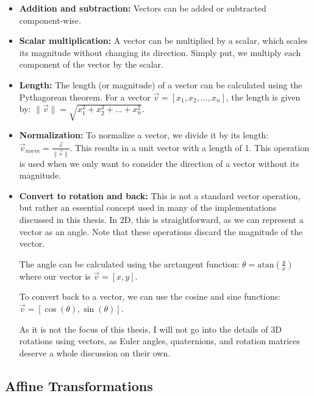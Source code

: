 \begin{itemize}
    \item \textbf{Addition and subtraction:} Vectors can be added or subtracted component-wise.
    
    \item \textbf{Scalar multiplication:} A vector can be multiplied by a scalar, which scales its magnitude without changing its direction. Simply put, we multiply each component of the vector by the scalar.
    
    \item \textbf{Length:} The length (or magnitude) of a vector can be calculated using the Pythagorean theorem. For a vector \(\vec{v} = [x_1, x_2, \ldots, x_n]\), the length is given by: \(\|\vec{v}\| = \sqrt{x_1^2 + x_2^2 + \ldots + x_n^2}\).
    
    \pagebreak

    \item \textbf{Normalization: } To normalize a vector, we divide it by its length: \(\vec{v}_{norm} = \frac{\vec{v}}{\|\vec{v}\|}\). This results in a unit vector with a length of 1. This operation is used when we only want to consider the direction of a vector without its magnitude.

    \item \textbf{Convert to rotation and back: } This is not a standard vector operation, but rather an essential concept used in many of the implementations discussed in this thesis. In 2D, this is straightforward, as we can represent a vector as an angle. Note that these operations discard the magnitude of the vector.
    
    The angle can be calculated using the arctangent function: \(\theta = \text{atan}(\frac{y}{x})\) where our vector is \(\vec{v}=[x,y]\). 
    
    To convert back to a vector, we can use the cosine and sine functions: \(\vec{v} = [\cos(\theta), \sin(\theta)]\). 
        
    As it is not the focus of this thesis, I will not go into the details of 3D rotations using vectors, as Euler angles, quaternions, and rotation matrices deserve a whole discussion on their own.
\end{itemize}

\subsection{Affine Transformations}
\label{sec:affine-transformations}

